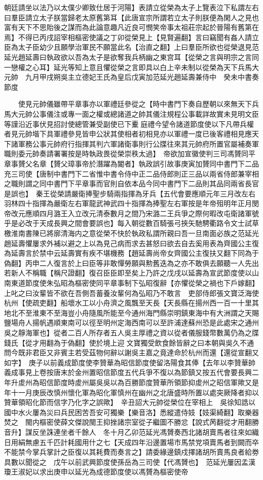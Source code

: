 朝廷請坐以法乃以太僕少卿致仕居于河陽】表請立從榮為太子上覽表泣下私謂左右曰羣臣請立太子朕當歸老太原舊第耳【此唐宣宗所謂若立太子則朕便為閑人之見也富有天下不思貽後之謀而為此論意趣凡近良可憫笑帝事太祖莊宗起於晉陽有舊第在焉】不得已丙戌詔宰相樞密使議之丁卯從榮見上【見賢遍翻】言曰竊聞有姦人請立臣為太子臣幼少且願學治軍民不願當此名【治直之翻】上曰羣臣所欲也從榮退見范延光趙延壽曰執政欲以吾為太子是欲奪我兵柄幽之東宫耳【從榮之言與明宗之言同一戀權之心耳】延光等知上意且懼從榮之言即具以白上辛未制以從榮為天下兵馬大元帥　九月甲戌朔吳主立德妃王氏為皇后戊寅加范延光趙延壽兼侍中　癸未中書奏節度

　　使見元帥儀雖帶平章事亦以軍禮廷參從之【時中書門下奏自歷朝以來無天下兵馬大元帥公事儀注或專一面之權或總諸道之帥其儀注規程公事載詳故實未見明文臣等謹沿近事伏見招討使總管兼受副使已下櫜庭禮今望令諸道節度使以下凡帶兵權者見元帥堦下具軍禮參見皆申公狀其使相者初相見亦以軍禮一度已後客禮相見應天下諸軍務公事元帥府行指揮其判六軍諸衛事則行公牒往來其元帥府所置官屬補奏軍職則委元帥奏請署署按是時執政畏從榮崇秩太過】　帝欲加宣徽使判三司馮贇同平章事贇父名章【贇父璋事帝於潛躍為閽者】執政誤引故事庚寅加贇同中書門下二品充三司使【唐制中書門下二省惟中書令侍中正二品侍郎則正三品以兩省侍郎兼宰相之職則謂之同中書門下平章事而官則自依本品今同中書門下二品則其品同兩省長官是誤也】　秦王從榮請嚴衛捧聖步騎兩指揮為牙兵【五代會要應順元年三月改左右羽林四十指揮為嚴衛左右軍龍武神武四十指揮為捧聖左右軍按是年帝殂明年正月閔帝改元應順四月潞王入立改元清泰數月之間乃宋潞二王兵爭之際何暇改屯衛諸軍號乎是必改于天成長興之間會要誤也】每入朝從數百騎張弓挾矢馳騁衢路令文士試草檄淮南書陳已將廓清海内之意從榮不快於執政私謂所親曰吾一旦南面必族之范延光趙延壽懼屢求外補以避之上以為見己病而求去甚怒曰欲去自去奚用表為齊國公主復為延壽言於禁中云延壽實有疾不堪機務【趙延壽尚帝女齊國公主復扶又翻下同為于偽翻】丙申二人復言於上曰臣等非敢憚勞願與勲舊迭為之亦不敢俱去願聽一人先出若新人不稱職【稱尺證翻】復召臣臣即至矣上乃許之戊戌以延壽為宣武節度使以山南東道節度使朱弘昭為樞密使同平章事制下弘昭復辭【亦懼從榮之禍也下戶嫁翻】上叱之曰汝輩皆不欲在吾側吾蓄養汝輩何為弘昭乃不敢言　吏部侍郎張文寶泛海使杭州【使疏吏翻】船壞水工以小舟濟之風飄至天長【天長縣在揚州西一百一十里其地北不至淮東不至海豈小舟隨風所能至今通州海門縣崇明鎮東海中有大洲謂之天賜鹽場舟人揚帆遇順東南可以徑至明州定海西南可以至許浦達蘇州恐是此處宋之通州吳之靜海軍也】從者二百人所存者五人吳主厚禮之資以從者儀服錢幣數萬仍為之牒錢氏【從才用翻為于偽翻】使於境上迎文寶獨受飲食餘皆辭之曰本朝與吳久不通問今既非君臣又非賓主若受茲物何辭以謝吳主嘉之竟達命於杭州而還【還從宣翻又如字】　庚子以前義成節度使李贊華為昭信節度使留洛陽食其俸【去年以李贊華帥義成事見上卷按唐末於金州置昭信節度五代兵爭不復以為節鎮又按五代會要長興二年升䖍州為昭信節度時䖍州屬吳吳以為百勝節度贊華所領節抑䖍州之昭信軍歟又是年十一月庚辰改慎州懷化軍為昭化軍慎州在幽州之北唐盛時所置以處突厥降者抑以贊華領昭化節而信字乃化字之誤歟】　辛丑詔大元帥從榮位在宰相上　吳徐知誥以國中水火屢為災曰兵民困苦吾安可獨樂【樂音洛】悉縱遣侍妓【妓渠綺翻】取樂器焚之　閩内樞密使薛文傑說閩王抑挫諸宗室從子繼圖不勝忿【說式苪翻從才用翻勝音升】謀反坐誅連坐者千餘人　冬十月乙卯范延光馮贇奏西北諸胡賣馬者往來如織日用絹無慮五千匹計耗國用什之七【天成四年沿邊置場市馬禁党項賣馬者到闕而卒不能禁今掌兵掌計之臣復以其耗費而奏言之】請委緣邊鎮戍擇諸胡所賣馬良者給劵具數以聞從之　戊午以前武興節度使孫岳為三司使【代馮贇也】　范延光屢因孟漢瓊王淑妃以求出庚申以延光為成德節度使以馮贇為樞密使帝